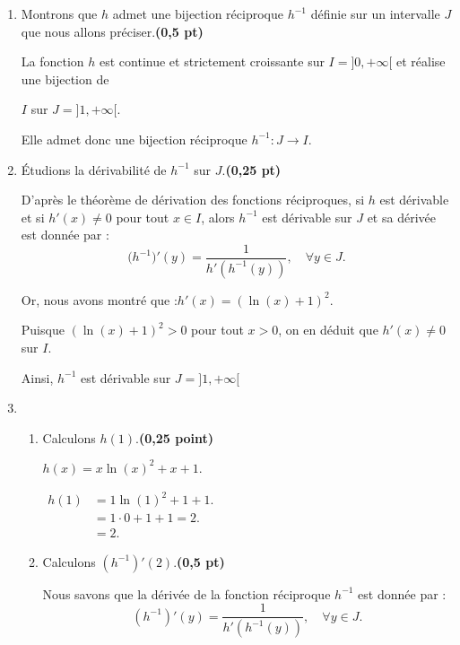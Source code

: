\documentclass[12pt,a4paper]{article}
\begin{document}
\begin{enumerate}
    \item Montrons que \( h \) admet une bijection réciproque \( h^{-1} \) définie sur un intervalle \( J \) que nous allons préciser.\hfill \textbf{(0,5 pt)}

          La fonction \(h\) est continue et strictement croissante sur \(I = ]0, +\infty[\) et réalise une bijection de

              \(I\) sur \(J = ]1, +\infty[\).

          Elle admet donc une bijection réciproque \( h^{-1}: J \to I. \)

    \item Étudions la dérivabilité de \( h^{-1} \) sur \( J \).\hfill \textbf{(0,25 pt)}

          D'après le théorème de dérivation des fonctions réciproques, si \( h \) est dérivable et si \( h'(x) \neq 0 \) pour tout \( x \in I \), alors \( h^{-1} \) est dérivable sur \( J \) et sa dérivée est donnée par :
          \[
              \big( h^{-1} \big)'(y) = \frac{1}{h'(h^{-1}(y))}, \quad \forall y \in J.
          \]

          Or, nous avons montré que :\( h'(x) = (\ln(x) + 1)^2. \)

          Puisque \( (\ln(x) + 1)^2 > 0 \) pour tout \( x > 0 \), on en déduit que \( h'(x) \neq 0 \) sur \( I \).

          Ainsi, \( h^{-1} \) est dérivable sur \( J = ]1, +\infty[ \)
    \item
          \begin{enumerate}
              \item Calculons \( h(1) \).\hfill \textbf{(0,25 point)}

                    \( h(x) = x \ln(x)^2 + x + 1. \)

                    \(
                    \begin{aligned}
                        h(1) & = 1 \ln(1)^2 + 1 + 1.    \\
                             & = 1 \cdot 0 + 1 + 1 = 2. \\
                             & = 2.
                    \end{aligned}
                    \)
              \item Calculons \( (h^{-1})'(2) \).\hfill \textbf{(0,5 pt)}

                    Nous savons que la dérivée de la fonction réciproque \( h^{-1} \) est donnée par :
                    \[
                        (h^{-1})'(y) = \frac{1}{h'(h^{-1}(y))}, \quad \forall y \in J.
                    \]


\end{enumerate}
\end{enumerate}
\end{document}
